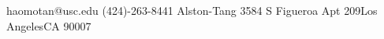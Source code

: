\contact
{haomotan@usc.edu}
{(424)-263-8441}
{Alston-Tang}
{}
{3584 S Figueroa Apt 209}{Los Angeles}{CA 90007}
